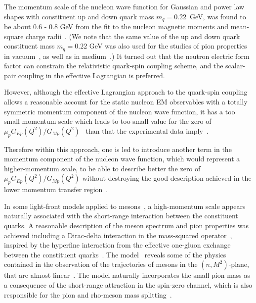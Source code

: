 \documentclass[preprint,aps,showpacs,floatfix]{revtex4}
\begin{document}
The momentum scale of the nucleon wave function for Gaussian and
power law shapes with constituent up and down quark mass $m_q = 0.22$~GeV, was
found to be about 0.6 - 0.8 GeV from the fit to the nucleon magnetic moments 
and mean-square charge radii~\cite{afsbw}. 
(We note that the same value of the up and down quark constituent mass $m_q = 0.22$ GeV 
was also used for the studies of pion properties in vacuum~\cite{Pacheco1}, as well as  
in medium~\cite{pimedium1,pimedium2,pimedium3,pimedium4}.)
It turned out that the neutron electric form factor 
can constrain the relativistic quark-spin coupling scheme,  
and the scalar-pair coupling in the effective Lagrangian is preferred.

However, although the effective Lagrangian approach to the quark-spin
coupling allows a reasonable account for the static
nucleon EM observables with a totally symmetric
momentum component of the nucleon wave function, 
it has a too small momentum scale which leads to too small value for 
the zero of $\mu_p G_{Ep}(Q^2)/G_{Mp}(Q^2)$~\cite{afsbw,Wilson1}  
than that the experimental data 
imply~\cite{Jones2000,Brash2002,Gayou2002,Punjabi2005,Ron2007,Puckett2010,Ron2011,Puckett2012}.   

Therefore within this approach, one is led to introduce another
term in the momentum component of the nucleon wave function, 
which would represent a higher-momentum scale, to be able to describe better 
the zero of $\mu_p G_{Ep}(Q^2)/G_{Mp}(Q^2)$ without destroying the     
good description achieved in the lower momentum transfer 
region~\cite{afsbw,Wilson2}.

In some light-front models applied to 
mesons~\cite{pauli,tob01,sg,deMelo2004,deMelo2006,Pace2007,deMelo2009,Pace2010}, 
a high-momentum scale appears naturally associated with the short-range interaction 
between the constituent quarks. 
A reasonable description of the meson spectrum and pion
properties was achieved including a Dirac-delta interaction 
in the mass-squared operator~\cite{pauli,tob01,sg}, 
inspired by the hyperfine interaction from the effective one-gluon exchange 
between the constituent quarks~\cite{pauli,brodsky}. 
The model~\cite{sg} reveals some of the physics contained in the observation of 
the trajectories of mesons in the $(n,M^2)$-plane, 
that are almost linear~\cite{iachello,anisov}. 
The model naturally incorporates the small pion mass as a consequence of the short-range
attraction in the spin-zero channel, which is also responsible for
the pion and rho-meson mass splitting~\cite{sg}.
\end{document}
